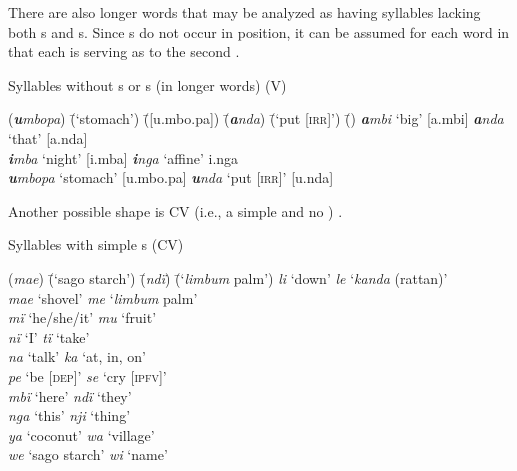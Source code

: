   There are also longer words that may be analyzed as having syllables lacking both s and s. Since   s do not occur in  position, it can be assumed for each word in  that each  is serving as  to the second .

\ea%
    \label{ex:phon:56}
          Syllables without s or s (in longer words) (V)\\
\begin{tabbing}
{(\textit{\textbf{u}mbopa})} \= {(‘stomach’)} \= {([u.mbo.pa])} \= {(\textit{\textbf{a}nda})} \= {(‘put [\textsc{irr]}’)} \= {()}\kill
{\textit{\textbf{a}mbi}} \> {‘big’} \> {[a.mbi]} \> {\textit{\textbf{a}nda}} \> {‘that’} \> {[a.nda]}\\
{\textit{\textbf{i}mba}} \> {‘night’} \> {[i.mba]} \> {\textit{\textbf{i}nga}} \> {‘affine’} \> {i.nga}\\
{\textit{\textbf{u}mbopa}} \> {‘stomach’} \> {[u.mbo.pa]} \> {\textit{\textbf{u}nda}} \> {‘put [\textsc{irr]}’} \> {[u.nda]}
\end{tabbing}
\z

Another possible  shape is CV (i.e., a simple  and no ) .

\ea%
    \label{ex:phon:57}
              Syllables with simple s (CV)
  \begin{tabbing}
  {(\textit{mae})} \= {(‘sago starch’)}   \=       {(\textit{ndï})}  \=  {(‘\textit{limbum} palm’)}\kill
   \textit{li}  \>  ‘down’    \>        \textit{le}  \>  ‘\textit{kanda} (rattan)’\\
    \textit{mae} \> ‘shovel’   \>       \textit{me}  \>  ‘\textit{limbum} palm’\\
    \textit{mï}  \>  ‘he/she/it’   \>       \textit{mu}  \>  ‘fruit’\\
    \textit{nï}  \>  ‘I’      \>        \textit{tï}  \>  ‘take’\\
    \textit{na}  \>  ‘talk’    \>        \textit{ka}  \>  ‘at, in, on’\\
    \textit{pe}  \>  ‘be [\textsc{dep]}’    \>      \textit{se}  \>  ‘cry [\textsc{ipfv}]’\\
    \textit{mbï} \> ‘here’     \>       \textit{ndï}  \>  ‘they’\\
    \textit{nga} \> ‘this’    \>        \textit{nji}  \>  ‘thing’\\
    \textit{ya}  \>  ‘coconut’   \>       \textit{wa}  \>  ‘village’\\
    \textit{we}  \>  ‘sago starch’   \>     \textit{wi}  \>  ‘name’
\end{tabbing}
\z

